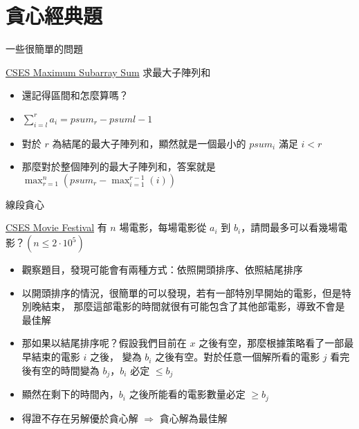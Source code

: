 \documentclass[aspectratio=169]{beamer}
\begin{document}
    \section{貪心經典題}

    \begin{frame}{一些很簡單的問題}
        \begin{block}{\href{https://cses.fi/problemset/task/1643}{CSES Maximum Subarray Sum}}
            求最大子陣列和
        \end{block}

        \begin{itemize}
            \item<1-> 還記得區間和怎麼算嗎？
            \item<2-> $\displaystyle\sum_{i = l}^{r}{a_i} = psum_{r} - psum{l - 1}$ 
            \item<3-> 對於 $r$ 為結尾的最大子陣列和，顯然就是一個最小的 $psum_{i}$ 滿足 $i < r$
            \item<4-> 那麼對於整個陣列的最大子陣列和，答案就是 
            $\displaystyle\max_{r = 1}^{n}(psum_{r} - \max_{i = 1}^{r - 1}(i))$
        \end{itemize}
    \end{frame}

    \begin{frame}{線段貪心}
        \begin{block}{\href{https://cses.fi/problemset/task/1629}{CSES Movie Festival}}
            有 $n$ 場電影，每場電影從 $a_i$ 到 $b_i$，請問最多可以看幾場電影？$(n \le 2 \cdot 10^5)$
        \end{block}

        \begin{itemize}
            \item<1-> 觀察題目，發現可能會有兩種方式：依照開頭排序、依照結尾排序
            \item<2-> 以開頭排序的情況，很簡單的可以發現，若有一部特別早開始的電影，但是特別晚結束，
            那麼這部電影的時間就很有可能包含了其他部電影，導致不會是最佳解
            \item<3-> 那如果以結尾排序呢？假設我們目前在 $x$ 之後有空，那麼根據策略看了一部最早結束的電影 $i$ 之後，
            變為 $b_i$ 之後有空。對於任意一個解所看的電影 $j$ 看完後有空的時間變為 $b_j$，$b_i$ 必定 $\le b_j$
            \item<4-> 顯然在剩下的時間內，$b_i$ 之後所能看的電影數量必定 $\ge b_j$
            \item<5-> 得證不存在另解優於貪心解 $\Rightarrow$ 貪心解為最佳解
        \end{itemize}
    \end{frame}
\end{document}
